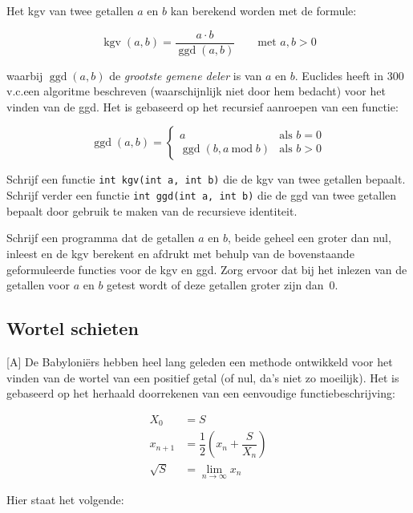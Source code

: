 \documentclass[a4paper,10pt,fleqn,twoside]{article}
\DeclareMathOperator{\kgv}{kgv}
\DeclareMathOperator{\ggd}{ggd}
\begin{document}
Het kgv van twee getallen $a$ en $b$ kan berekend worden met de formule:

\begin{equation*}
\kgv(a,b) = \dfrac{a\cdot b}{\ggd(a,b)} \qquad \text{met }a,b > 0
\end{equation*}

waarbij $\ggd(a,b)$ de \textsl{grootste gemene deler} is van $a$ en $b$. 
Euclides heeft in 300 v.c.\@ een algoritme beschreven (waarschijnlijk niet door hem bedacht) voor het vinden van de ggd. Het is gebaseerd op het recursief aanroepen van een functie:

\begin{equation*}
\ggd(a,b)= \begin{cases}
a &\text{als } b = 0 \\
\ggd(b, a\:\mathrm{mod}\; b) &\text{als } b > 0
\end{cases}
\end{equation*}

Schrijf een functie \lstinline|int kgv(int a, int b)| die de kgv van twee getallen bepaalt. Schrijf verder een functie \lstinline|int ggd(int a, int b)| die de ggd van twee getallen bepaalt door gebruik te maken van de recursieve identiteit.

Schrijf een programma dat de getallen $a$ en $b$, beide geheel een groter dan nul, inleest en de kgv berekent en afdrukt met behulp van de bovenstaande geformuleerde functies voor de kgv en ggd. Zorg ervoor dat bij het inlezen van de getallen voor $a$ en $b$ getest wordt of deze getallen groter zijn dan~0.


\subsection{Wortel schieten}[A]
De Babyloniërs hebben heel lang geleden een methode ontwikkeld voor het vinden van de wortel van een positief getal (of nul, da’s niet zo moeilijk). Het is gebaseerd op het herhaald doorrekenen van een eenvoudige functiebeschrijving:

\begin{align*}
X_0 &= S \\
x_{n+1} &= \dfrac{1}{2}\left(x_n + \dfrac{S}{X_n}\right) \\
\sqrt{S} &= \lim\limits_{n\rightarrow\infty} x_n
\end{align*}

Hier staat het volgende:
\end{document}
